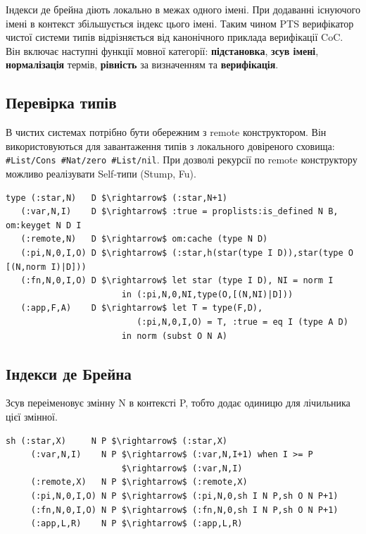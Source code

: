 \begin{definition}
\begin{definition}
\begin{definition}
\begin{definition}
Індекси де брейна діють локально в межах одного імені.
При додаванні існуючого імені в контекст збільшується індекс цього імені.
Таким чином PTS верифікатор чистої системи типів відрізняється від
канонічного приклада верифікації CoC\cite{Coq96}. Він включає
наступні функції мовної категорії: {\bf підстановка},
{\bf зсув імені}, {\bf нормалізація} термів, {\bf рівність}
за визначенням та {\bf верифікація}.

\subsection{Перевірка типів}

В чистих системах потрібно бути обережним з remote конструктором.
Він використовуються для завантаження типів з локального довіреного сховища:
\lstinline{#List/Cons #Nat/zero #List/nil}. При дозволі рекурсії
по remote конструктору можливо реалізувати Self-типи (Stump, Fu).

\begin{lstlisting}[mathescape=true]
type (:star,N)   D $\rightarrow$ (:star,N+1)
   (:var,N,I)    D $\rightarrow$ :true = proplists:is_defined N B, om:keyget N D I
   (:remote,N)   D $\rightarrow$ om:cache (type N D)
   (:pi,N,0,I,O) D $\rightarrow$ (:star,h(star(type I D)),star(type O [(N,norm I)|D]))
   (:fn,N,0,I,O) D $\rightarrow$ let star (type I D), NI = norm I
                       in (:pi,N,0,NI,type(O,[(N,NI)|D]))
   (:app,F,A)    D $\rightarrow$ let T = type(F,D),
                          (:pi,N,0,I,O) = T, :true = eq I (type A D)
                       in norm (subst O N A)
\end{lstlisting}

\subsection{Індекси де Брейна}

Зсув переіменовує змінну N в контексті P, тобто додає одиницю для лічильника цієї змінної.

\begin{lstlisting}[mathescape=true]
  sh (:star,X)     N P $\rightarrow$ (:star,X)
     (:var,N,I)    N P $\rightarrow$ (:var,N,I+1) when I >= P
                       $\rightarrow$ (:var,N,I)
     (:remote,X)   N P $\rightarrow$ (:remote,X)
     (:pi,N,0,I,O) N P $\rightarrow$ (:pi,N,0,sh I N P,sh O N P+1)
     (:fn,N,0,I,O) N P $\rightarrow$ (:fn,N,0,sh I N P,sh O N P+1)
     (:app,L,R)    N P $\rightarrow$ (:app,L,R)
\end{lstlisting}


\end{definition}
\end{definition}
\end{definition}
\end{definition}
